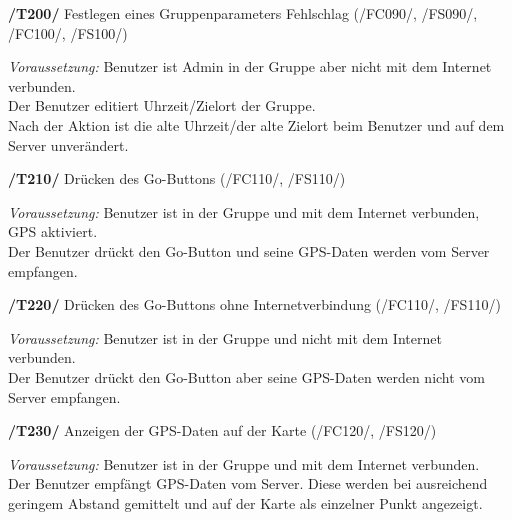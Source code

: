 \textbf{/T200/} Festlegen eines Gruppenparameters Fehlschlag (/FC090/, /FS090/, /FC100/, /FS100/)\\
\begin{center}
\vspace{-\parskip}
\begin{minipage}[t]{0.9\textwidth}
\emph{Voraussetzung:} Benutzer ist Admin in der Gruppe aber nicht mit dem Internet verbunden.\\
Der Benutzer editiert Uhrzeit/Zielort der Gruppe.                                      \\
Nach der Aktion ist die alte Uhrzeit/der alte Zielort beim Benutzer und auf dem Server unverändert.\\
\end{minipage}
\end{center}

\textbf{/T210/} Drücken des Go-Buttons (/FC110/, /FS110/)\\
\begin{center}
\vspace{-\parskip}
\begin{minipage}[t]{0.9\textwidth}
\emph{Voraussetzung:} Benutzer ist in der Gruppe und mit dem Internet verbunden, GPS aktiviert.\\
Der Benutzer drückt den Go-Button und seine GPS-Daten werden vom Server empfangen.       \\
\end{minipage}
\end{center}

\textbf{/T220/} Drücken des Go-Buttons ohne Internetverbindung (/FC110/, /FS110/)\\
\begin{center}
\vspace{-\parskip}
\begin{minipage}[t]{0.9\textwidth}
\emph{Voraussetzung:} Benutzer ist in der Gruppe und nicht mit dem Internet verbunden.           \\
Der Benutzer drückt den Go-Button aber seine GPS-Daten werden nicht vom Server empfangen.  \\
\end{minipage}
\end{center}

\textbf{/T230/} Anzeigen der GPS-Daten auf der Karte (/FC120/, /FS120/)\\
\begin{center}
\vspace{-\parskip}
\begin{minipage}[t]{0.9\textwidth}
\emph{Voraussetzung:} Benutzer ist in der Gruppe und mit dem Internet verbunden.                                     \\
Der Benutzer empfängt GPS-Daten vom Server. Diese werden bei ausreichend geringem Abstand gemittelt
und auf der Karte als einzelner Punkt angezeigt.                                                                \\
\end{minipage}
\end{center}

